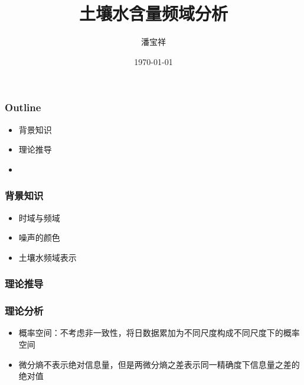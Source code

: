 \documentclass{beamer}
\begin{document}
\begin{CJK}{UTF8}{gkai}
\title{土壤水含量频域分析}
\date{\today}
\author{潘宝祥}
\maketitle

\begin{frame}
\frametitle{Outline}
\begin{itemize}
\item 背景知识
\item 理论推导
\item 
\end{itemize}
\end{frame}



\begin{frame}
\frametitle{背景知识}
\begin{itemize}
\item 时域与频域
\item 噪声的颜色
\item 土壤水频域表示
\end{itemize}
\end{frame}

\begin{frame}
\frametitle{理论推导}
 
\end{frame}

\begin{frame}
\frametitle{理论分析}
 \begin{itemize}
 \item 概率空间：不考虑非一致性，将日数据累加为不同尺度构成不同尺度下的概率空间
 \item 微分熵不表示绝对信息量，但是两微分熵之差表示同一精确度下信息量之差的绝对值
 \end{itemize}
\end{frame}


\end{CJK}
\end{document}
